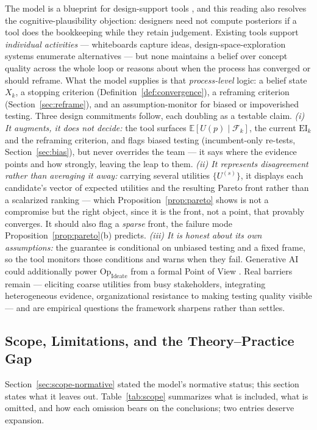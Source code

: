 \documentclass[11pt]{article}
\newcommand{\E}{\mathbb{E}}
\newcommand{\filt}{\mathcal{F}}     %
\newcommand{\Op}[1]{\mathrm{Op}_{\mathrm{#1}}}
\begin{document}
The model is a blueprint for design-support tools \citep{uebernickel2020, wuttke2024}, and this reading also resolves the cognitive-plausibility objection: designers need not compute posteriors if a tool does the bookkeeping while they retain judgement. Existing tools support \emph{individual activities} --- whiteboards capture ideas, design-space-exploration systems \citep{woodbury2006} enumerate alternatives --- but none maintains a belief over concept quality across the whole loop or reasons about when the process has converged or should reframe. What the model supplies is that \emph{process-level} logic: a belief state $X_k$, a stopping criterion (Definition~\ref{def:convergence}), a reframing criterion (Section~\ref{sec:reframe}), and an assumption-monitor for biased or impoverished testing. Three design commitments follow, each doubling as a testable claim. \emph{(i) It augments, it does not decide:} the tool surfaces $\E[U(p)\mid\filt_k]$, the current $\mathrm{EI}_k$ and the reframing criterion, and flags biased testing (incumbent-only re-tests, Section~\ref{sec:bias}), but never overrides the team --- it says where the evidence points and how strongly, leaving the leap to them. \emph{(ii) It represents disagreement rather than averaging it away:} carrying several utilities $\{U^{(s)}\}$, it displays each candidate's vector of expected utilities and the resulting Pareto front rather than a scalarized ranking --- which Proposition~\ref{prop:pareto} shows is not a compromise but the right object, since it is the front, not a point, that provably converges. It should also flag a \emph{sparse} front, the failure mode Proposition~\ref{prop:pareto}(b) predicts. \emph{(iii) It is honest about its own assumptions:} the guarantee is conditional on unbiased testing and a fixed frame, so the tool monitors those conditions and warns when they fail. Generative AI could additionally power $\Op{Ideate}$ from a formal Point of View \citep{brenner2016, enkmann2025}. Real barriers remain --- eliciting coarse utilities from busy stakeholders, integrating heterogeneous evidence, organizational resistance to making testing quality visible --- and are empirical questions the framework sharpens rather than settles.

\subsection{Scope, Limitations, and the Theory--Practice Gap}
\label{sec:limitations}

Section~\ref{sec:scope-normative} stated the model's normative status; this section states what it leaves out. Table~\ref{tab:scope} summarizes what is included, what is omitted, and how each omission bears on the conclusions; two entries deserve expansion.
\end{document}
